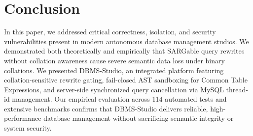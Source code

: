 \documentclass[conference]{IEEEtran}
\begin{document}
\section{Conclusion}
In this paper, we addressed critical correctness, isolation, and security vulnerabilities present in modern autonomous database management studios. We demonstrated both theoretically and empirically that SARGable query rewrites without collation awareness cause severe semantic data loss under binary collations. We presented DBMS-Studio, an integrated platform featuring collation-sensitive rewrite gating, fail-closed AST sandboxing for Common Table Expressions, and server-side synchronized query cancellation via MySQL thread-id management. Our empirical evaluation across 114 automated tests and extensive benchmarks confirms that DBMS-Studio delivers reliable, high-performance database management without sacrificing semantic integrity or system security.
\end{document}
